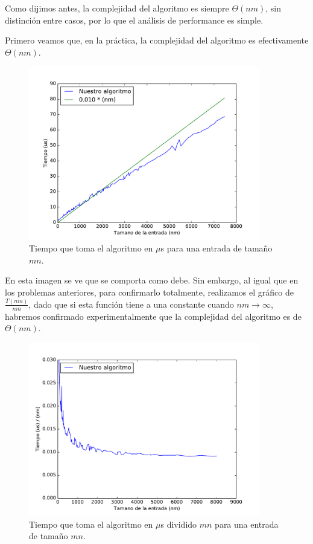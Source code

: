 

Como dijimos antes, la complejidad del algoritmo es siempre $\Theta(n m)$, sin distinción entre casos, por lo que el análisis de performance es simple.

Primero veamos que, en la práctica, la complejidad del algoritmo es efectivamente $\Theta(n m)$.

\begin{figure}[H]
 \centering
	\includegraphics[width=0.9\textwidth]{img/exp/problema3-promedio.pdf}
	\caption{\footnotesize Tiempo que toma el algoritmo en $\mu$s para una entrada de tamaño $mn$.}
	\label{fig:problema3-promedio}
\end{figure}

En esta imagen se ve que se comporta como debe. Sin embargo, al igual que en los problemas anteriores, para confirmarlo totalmente, realizamos el gráfico de $\frac{T(nm)}{nm}$, dado que si esta función tiene a una constante cuando $nm \to \infty$, habremos confirmado experimentalmente que la complejidad del algoritmo es de $\Theta(n m)$.

\begin{figure}[H]
 \centering
	\includegraphics[width=0.9\textwidth]{img/exp/problema3-promedio2.pdf}
	\caption{\footnotesize Tiempo que toma el algoritmo en $\mu$s dividido $mn$ para una entrada de tamaño $mn$.}
	\label{fig:problema3-promedio2}
\end{figure}


